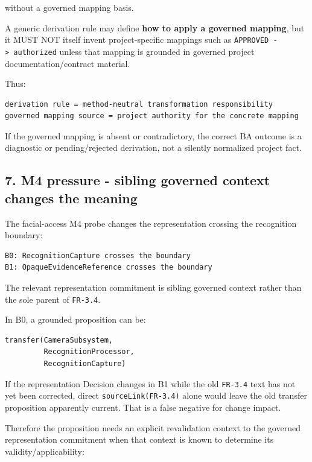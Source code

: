 \documentclass[11pt,a4paper]{article}
\begin{document}
without a governed mapping basis.

A generic derivation rule may define \textbf{how to apply a governed
mapping}, but it MUST NOT itself invent project-specific mappings such
as \texttt{APPROVED\ -\textgreater{}\ authorized} unless that mapping is
grounded in governed project documentation/contract material.

Thus:

\begin{verbatim}
derivation rule = method-neutral transformation responsibility
governed mapping source = project authority for the concrete mapping
\end{verbatim}

If the governed mapping is absent or contradictory, the correct BA
outcome is a diagnostic or pending/rejected derivation, not a silently
normalized project fact.

\subsection{7. M4 pressure - sibling governed context changes the
meaning}\label{m4-pressure---sibling-governed-context-changes-the-meaning}

The facial-access M4 probe changes the representation crossing the
recognition boundary:

\begin{verbatim}
B0: RecognitionCapture crosses the boundary
B1: OpaqueEvidenceReference crosses the boundary
\end{verbatim}

The relevant representation commitment is sibling governed context
rather than the sole parent of \texttt{FR-3.4}.

In B0, a grounded proposition can be:

\begin{verbatim}
transfer(CameraSubsystem,
         RecognitionProcessor,
         RecognitionCapture)
\end{verbatim}

If the representation Decision changes in B1 while the old
\texttt{FR-3.4} text has not yet been corrected, direct
\texttt{sourceLink(FR-3.4)} alone would leave the old transfer
proposition apparently current. That is a false negative for change
impact.

Therefore the proposition needs an explicit revalidation context to the
governed representation commitment when that context is known to
determine its validity/applicability:
\end{document}
